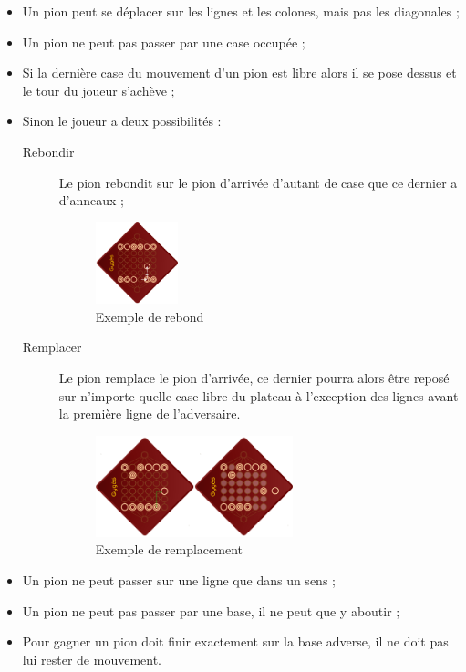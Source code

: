 \documentclass[a4paper]{article}
\begin{document}
\begin{itemize}
				\item Un pion peut se déplacer sur les lignes et les colones, mais pas les diagonales ;
				\item Un pion ne peut pas passer par une case occupée ;
				\item Si la dernière case du mouvement d'un pion est libre alors il se pose dessus et le tour
				du joueur s'achève ;
				\item Sinon le joueur a deux possibilités :
					\begin{description}
						\item[Rebondir] Le pion rebondit sur le pion d'arrivée d'autant de case que
							ce dernier a d'anneaux ;
							\begin{figure}[h]
								\centering
								\includegraphics[width=0.25\textwidth]{rebond.png}
								\caption{Exemple de rebond}
								\label{fig:plateau_de_gyges}
							\end{figure}
						\item[Remplacer] Le pion remplace le pion d'arrivée, ce dernier pourra alors être
							reposé sur n'importe quelle case libre du plateau à l'exception des lignes avant
							la première ligne de l'adversaire.
							\begin{figure}[h]
								\centering
								\includegraphics[width=0.6\textwidth]{remplacement.png}
								\caption{Exemple de remplacement}
								\label{fig:plateau_de_gyges}
							\end{figure}
					\end{description}
				\item Un pion ne peut passer sur une ligne que dans un sens ;
				\item Un pion ne peut pas passer par une base, il ne peut que y aboutir ;
				\item Pour gagner un pion doit finir exactement sur la base adverse, il ne doit pas lui
					rester de mouvement.
			\end{itemize}
\end{document}
